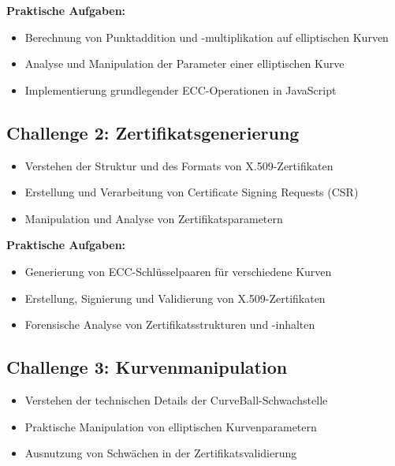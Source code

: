 \documentclass{article}
\begin{document}
\textbf{Praktische Aufgaben:}
\begin{itemize}[leftmargin=1.5cm]
    \item Berechnung von Punktaddition und -multiplikation auf elliptischen Kurven
    \item Analyse und Manipulation der Parameter einer elliptischen Kurve
    \item Implementierung grundlegender ECC-Operationen in JavaScript
\end{itemize}

\vspace{0.8cm}

\newpage

\subsection{Challenge 2: Zertifikatsgenerierung}

\begin{tcolorbox}[colback=thd-blue!10,colframe=thd-blue,title=\textbf{Lernziele}]
\begin{itemize}[leftmargin=1cm]
    \item Verstehen der Struktur und des Formats von X.509-Zertifikaten
    \item Erstellung und Verarbeitung von Certificate Signing Requests (CSR)
    \item Manipulation und Analyse von Zertifikatsparametern
\end{itemize}
\end{tcolorbox}

\textbf{Praktische Aufgaben:}
\begin{itemize}[leftmargin=1.5cm]
    \item Generierung von ECC-Schlüsselpaaren für verschiedene Kurven
    \item Erstellung, Signierung und Validierung von X.509-Zertifikaten
    \item Forensische Analyse von Zertifikatsstrukturen und -inhalten
\end{itemize}

\vspace{0.8cm}

\subsection{Challenge 3: Kurvenmanipulation}

\begin{tcolorbox}[colback=orange!10,colframe=orange,title=\textbf{Lernziele}]
\begin{itemize}[leftmargin=1cm]
    \item Verstehen der technischen Details der CurveBall-Schwachstelle
    \item Praktische Manipulation von elliptischen Kurvenparametern
    \item Ausnutzung von Schwächen in der Zertifikatsvalidierung
\end{itemize}
\end{tcolorbox}
\end{document}
